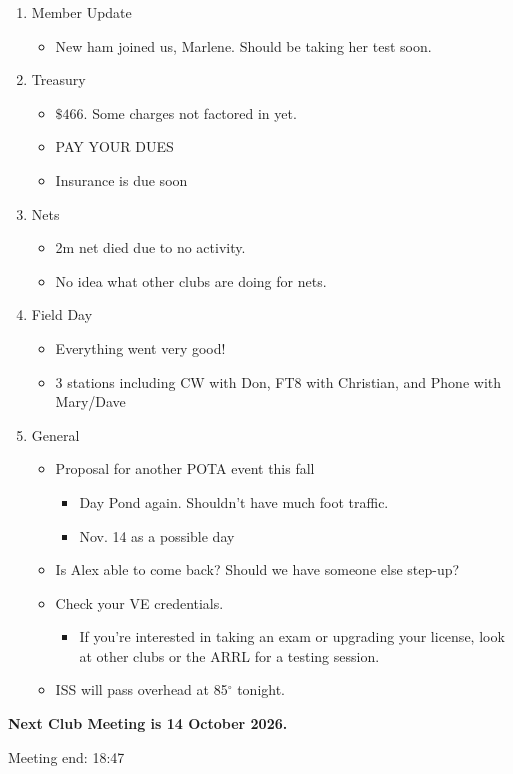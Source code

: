 \documentclass[12pt, letterpaper]{article}
\begin{document}
    \begin{enumerate}
    \item Member Update
        \begin{itemize}
            \item  New ham joined us, Marlene. Should be taking her test soon.
        \end{itemize}
    \item Treasury
        \begin{itemize}
            \item $\mathdollar 466$. Some charges not factored in yet.
            \item PAY YOUR DUES
            \item Insurance is due soon
        \end{itemize}
    \item Nets
        \begin{itemize}
            \item 2m net died due to no activity.
            \item No idea what other clubs are doing for nets.
        \end{itemize}
    \item Field Day
        \begin{itemize}
            \item Everything went very good!
            \item 3 stations including CW with Don, FT8 with Christian, and Phone with Mary/Dave
        \end{itemize}
    \item General
        \begin{itemize}
            \item Proposal for another POTA event this fall
                \begin{itemize}
                    \item Day Pond again. Shouldn't have much foot traffic.
                    \item Nov. 14 as a possible day
                \end{itemize}
            \item Is Alex able to come back? Should we have someone else step-up?
            \item Check your VE credentials.
                \begin{itemize}
                    \item If you're interested in taking an exam or upgrading your license, look at other clubs or the ARRL for a testing session.
                \end{itemize}
            \item ISS will pass overhead at 85$^\circ$ tonight.
        \end{itemize}
    \end{enumerate}

    \textbf{\Large{Next Club Meeting is 14 October 2026.}}

    Meeting end: 18:47
\end{document}
